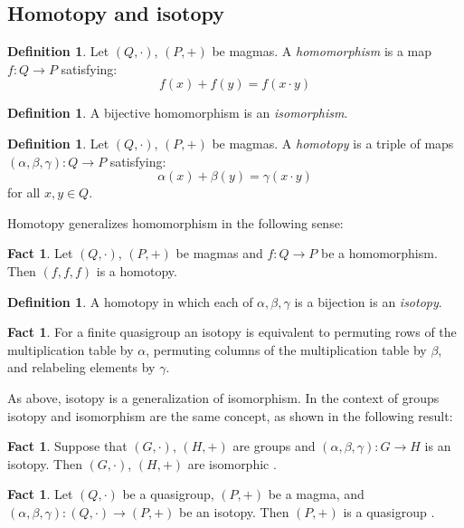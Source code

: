 \documentclass[12pt, twoside, openright]{report}
\theoremstyle{definition}
\newtheorem{fct}[thm]{Fact}
\newtheorem{dfn}[thm]{Definition}
\begin{document}
\subsection{Homotopy and isotopy}

\begin{dfn}
  Let $(Q, \cdot)$, $(P, +)$ be magmas. A \emph{homomorphism} is a map $f: Q\to P$ satisfying:
  \[f(x) + f(y) = f(x\cdot y)\]
\end{dfn}

\begin{dfn}
  A bijective homomorphism is an \emph{isomorphism}.
\end{dfn}

\begin{dfn}
  Let $(Q, \cdot)$, $(P, +)$ be magmas. A \emph{homotopy} is a triple of maps $(\alpha, \beta, \gamma): Q\to P$ satisfying: 
  \[\alpha(x) + \beta(y) = \gamma(x\cdot y)\]
  for all $x, y\in Q$.
\end{dfn}

Homotopy generalizes homomorphism in the following sense:

\begin{fct}
Let $(Q, \cdot)$, $(P, +)$ be magmas and $f: Q\to P$ be a homomorphism. Then $(f, f, f)$ is a homotopy.
\end{fct}

\begin{dfn}
  A homotopy in which each of $\alpha, \beta, \gamma$ is a bijection is an \emph{isotopy}.
\end{dfn}

\begin{fct}
  For a finite quasigroup an isotopy is equivalent to permuting rows of the multiplication table by $\alpha$,
    permuting columns of the multiplication table by $\beta$, and relabeling elements by $\gamma$.
\end{fct}

As above, isotopy is a generalization of isomorphism. In the context of groups isotopy and isomorphism are the same
  concept, as shown in the following result: 

\begin{fct}
  Suppose that $(G, \cdot)$, $(H, +)$ are groups and $(\alpha, \beta, \gamma): G\to H$ is an isotopy. Then $(G, \cdot)$,
    $(H, +)$ are isomorphic \cite{Bruck}.
\end{fct}

\begin{fct}
  Let $(Q, \cdot)$ be a quasigroup, $(P, +)$ be a magma, and $(\alpha, \beta, \gamma): (Q, \cdot)\to (P, +)$ be an isotopy.
    Then $(P, +)$ is a quasigroup \cite{Bruck}.
\end{fct}
\end{document}
